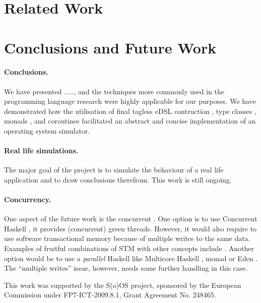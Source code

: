 \section{Related Work}
\label{sec:related-work}


\section{Conclusions and Future Work}
\label{sec:concl-future-work}

\paragraph{Conclusions.}  We have
presented ....., and the techniques more commonly used in the
programming language research were highly applicable for our
purposes. We have demonstrated how the utilisation of final tagless
eDSL contruction \cite{...}, type classes \cite{...}, monads
\cite{...}, and coroutines \cite{...} facilitated an abstract and
concise implementation of an operating system simulator.

\paragraph{Real life simulations.} The major goal of the project is to
simulate the behaviour of a real life application and to draw
conclusions therefrom. This work is still ongoing.

\paragraph{Concurrency.} One aspect of the future work is the
concurrent \soosim. One option is to use Concurrent Haskell
\cite{ConcHs}, it provides (concurrent) green threads. However, it
would also require to use software transactional memory
\cite{springerlink:10.1007/s004460050028} because of multiple writes
to the same data. Examples of fruitful combinations of STM with other
concepts include
\cite{Harris:2008:CMT:1378704.1378725,Bieniusa:2010:BAA:1835698.1835714}.
Another option would be to use a \emph{parallel} Haskell like
Multicore Haskell \cite{marlow:rsm},  monad \cite{par-monad}
or Eden \cite{eden}. The ``multiple writes'' issue, however, needs
some further handling in this case.

%

\acks

This work was supported by the S(o)OS project, sponsored by the
European Commission under FP7-ICT-2009.8.1, Grant Agreement
No. 248465.

